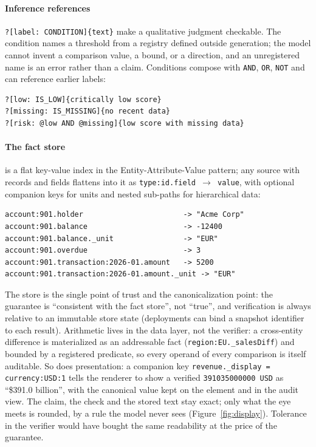 \documentclass[11pt,a4paper]{article}
\begin{document}
\paragraph{Inference references} \texttt{?[label: CONDITION]\{text\}} make a qualitative judgment checkable. The condition names a threshold from a registry defined outside generation; the model cannot invent a comparison value, a bound, or a direction, and an unregistered name is an error rather than a claim. Conditions compose with \texttt{AND}, \texttt{OR}, \texttt{NOT} and can reference earlier labels:

\begin{lstlisting}
?[low: IS_LOW]{critically low score}
?[missing: IS_MISSING]{no recent data}
?[risk: @low AND @missing]{low score with missing data}
\end{lstlisting}

\paragraph{The fact store} is a flat key-value index in the Entity-Attribute-Value pattern; any source with records and fields flattens into it as \texttt{type:id.field $\rightarrow$ value}, with optional companion keys for units and nested sub-paths for hierarchical data:

\begin{lstlisting}
account:901.holder                       -> "Acme Corp"
account:901.balance                      -> -12400
account:901.balance._unit                -> "EUR"
account:901.overdue                      -> 3
account:901.transaction:2026-01.amount   -> 5200
account:901.transaction:2026-01.amount._unit -> "EUR"
\end{lstlisting}

\noindent The store is the single point of trust and the canonicalization point: the guarantee is ``consistent with the fact store'', not ``true'', and verification is always relative to an immutable store state (deployments can bind a snapshot identifier to each result). Arithmetic lives in the data layer, not the verifier: a cross-entity difference is materialized as an addressable fact (\texttt{region:EU.\_salesDiff}) and bounded by a registered predicate, so every operand of every comparison is itself auditable. So does presentation: a companion key \texttt{revenue.\_display = currency:USD:1} tells the renderer to show a verified \texttt{391035000000 USD} as ``\$391.0 billion'', with the canonical value kept on the element and in the audit view. The claim, the check and the stored text stay exact; only what the eye meets is rounded, by a rule the model never sees (Figure~\ref{fig:display}). Tolerance in the verifier would have bought the same readability at the price of the guarantee.
\end{document}
